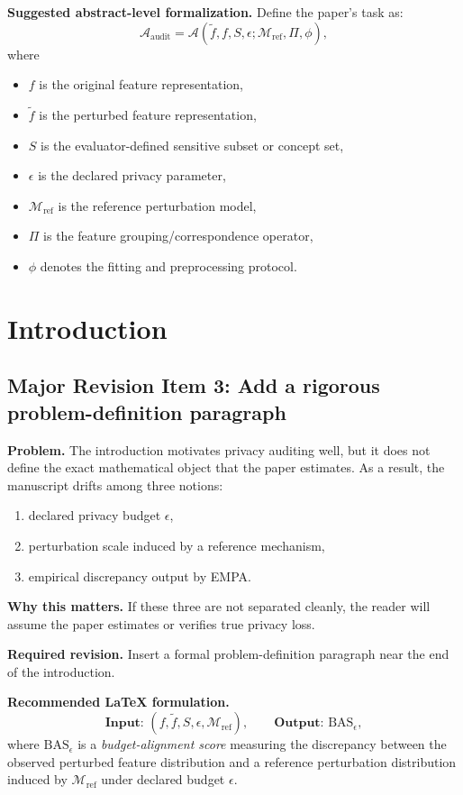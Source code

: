 \textbf{Suggested abstract-level formalization.}
Define the paper's task as:
\[
\mathcal{A}_{\text{audit}}
=
\mathcal{A}\!\left(
\tilde{f}, f, S, \epsilon ; \mathcal{M}_{\mathrm{ref}}, \Pi, \phi
\right),
\]
where
\begin{itemize}
    \item $f$ is the original feature representation,
    \item $\tilde{f}$ is the perturbed feature representation,
    \item $S$ is the evaluator-defined sensitive subset or concept set,
    \item $\epsilon$ is the declared privacy parameter,
    \item $\mathcal{M}_{\mathrm{ref}}$ is the reference perturbation model,
    \item $\Pi$ is the feature grouping/correspondence operator,
    \item $\phi$ denotes the fitting and preprocessing protocol.
\end{itemize}

\section{Introduction}

\subsection*{Major Revision Item 3: Add a rigorous problem-definition paragraph}
\textbf{Problem.} The introduction motivates privacy auditing well, but it does not define the exact mathematical object that the paper estimates. As a result, the manuscript drifts among three notions:
\begin{enumerate}
    \item declared privacy budget $\epsilon$,
    \item perturbation scale induced by a reference mechanism,
    \item empirical discrepancy output by EMPA.
\end{enumerate}

\textbf{Why this matters.} If these three are not separated cleanly, the reader will assume the paper estimates or verifies true privacy loss.

\textbf{Required revision.}
Insert a formal problem-definition paragraph near the end of the introduction.

\textbf{Recommended LaTeX formulation.}
\[
\textbf{Input: } (f,\tilde{f},S,\epsilon,\mathcal{M}_{\mathrm{ref}}),
\qquad
\textbf{Output: } \mathrm{BAS}_\epsilon,
\]
where $\mathrm{BAS}_\epsilon$ is a \emph{budget-alignment score} measuring the discrepancy between the observed perturbed feature distribution and a reference perturbation distribution induced by $\mathcal{M}_{\mathrm{ref}}$ under declared budget $\epsilon$.


